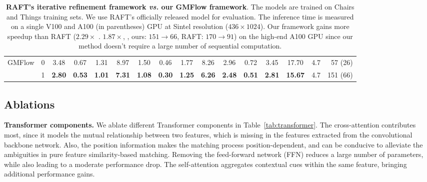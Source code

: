 \documentclass[10pt,twocolumn,letterpaper]{article}
\begin{document}
\begin{table*}[t]
\begin{tabular}{lccccccccccccccr}
    \midrule
     
     
     \multirow{2}{*}[-2pt]{{GMFlow}} & 0 & 3.48 & 0.67 & 1.31  & 8.97 & 1.50 & 0.46  & 1.77 & 8.26  & 2.96  & 0.72 & 3.45  & 17.70 & 4.7 & 57 (26) \\
     & 1 & \textbf{2.80} & \textbf{0.53} & \textbf{1.01} & \textbf{7.31} & \textbf{1.08} & \textbf{0.30} & \textbf{1.25} & \textbf{6.26} & \textbf{2.48} & \textbf{0.51}  & \textbf{2.81} & \textbf{15.67} & 4.7 & 151 (66) \\
    
    
    \bottomrule
    \end{tabular}
    \vspace{-5pt}
    \caption{\textbf{RAFT's iterative refinement framework \textit{vs.} our GMFlow framework}. The models are trained on Chairs and Things training sets. We use RAFT's officially released model for evaluation. The inference time is measured on a single V100 and A100 (in parentheses) GPU at Sintel resolution ($436\times 1024$). Our framework gains more speedup than RAFT ($2.29\times$ \vs. $1.87 \times$, \ie, ours: $151 \to 66$, RAFT: $170 \to 91$) on the high-end A100 GPU since our method doesn't require a large number of sequential computation.
    }
    \label{tab:raft_vs_ours}
    \vspace{-10pt}
\end{table*}


















\subsection{Ablations}
\label{sec:ablation}


{\bf Transformer components.} We ablate different Transformer components in Table~\ref{tab:transformer}. The cross-attention contributes most, since it models the mutual relationship between two features, which is missing in the features extracted from the convolutional backbone network. Also, the position information makes the matching process position-dependent, and can be conducive to alleviate the ambiguities in pure feature similarity-based matching. Removing the feed-forward network (FFN) reduces a large number of parameters, while also leading to a moderate performance drop. The self-attention aggregates contextual cues within the same feature, bringing additional performance gains.
\end{document}
